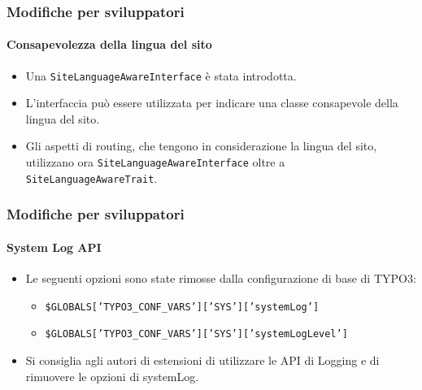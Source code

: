 
\begin{frame}[fragile]
	\frametitle{Modifiche per sviluppatori}
	\framesubtitle{Consapevolezza della lingua del sito}

	\lstset{basicstyle=\tiny\ttfamily}


	\begin{itemize}
		\item Una \texttt{SiteLanguageAwareInterface} è stata introdotta.
		\item L'interfaccia può essere utilizzata per indicare una classe consapevole della lingua del sito.
		\item Gli aspetti di routing, che tengono in considerazione la lingua del sito,
			utilizzano ora \texttt{SiteLanguageAwareInterface}
			oltre a \texttt{SiteLanguageAwareTrait}.
	\end{itemize}

\end{frame}


\begin{frame}[fragile]
	\frametitle{Modifiche per sviluppatori}
	\framesubtitle{System Log API}

	\lstset{basicstyle=\tiny\ttfamily}

	\begin{itemize}
		\item Le seguenti opzioni sono state rimosse dalla configurazione di base di TYPO3:

			\begin{itemize}\smaller
				\item \texttt{\$GLOBALS['TYPO3\_CONF\_VARS']['SYS']['systemLog']}
				\item \texttt{\$GLOBALS['TYPO3\_CONF\_VARS']['SYS']['systemLogLevel']}
			\end{itemize}\normalsize

		\item Si consiglia agli autori di estensioni di utilizzare le API di Logging e di rimuovere le opzioni di systemLog.
	\end{itemize}

\end{frame}

